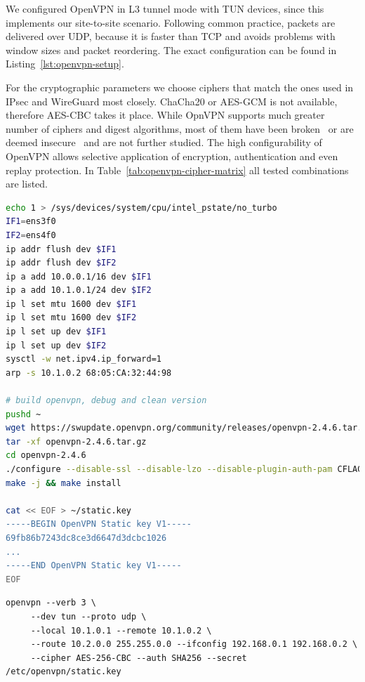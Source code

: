 \documentclass[IN,11pt,twoside,openright,master,english]{tumthesis}
\begin{document}
We configured OpenVPN in L3 tunnel mode with TUN devices, since this implements our site-to-site scenario. Following common practice, packets are delivered over UDP, because it is faster than TCP and avoids problems with window sizes and packet reordering. The exact configuration can be found in Listing~\ref{lst:openvpn-setup}.


For the cryptographic parameters we choose ciphers that match the ones used in IPsec and WireGuard most closely. ChaCha20 or AES-GCM is not available, therefore AES-CBC takes it place. While OpnVPN supports much greater number of ciphers and digest algorithms, most of them have been broken~\cite{} or are deemed insecure~\cite{} and are not further studied. The high configurability of OpenVPN allows selective application of encryption, authentication and even replay protection.
In Table~\ref{tab:openvpn-cipher-matrix} all tested combinations are listed.

\begin{lstlisting}[caption={DuT peraration steps for OpenVPN},captionpos=b,label={lst:openvpn-prep},language=bash]
echo 1 > /sys/devices/system/cpu/intel_pstate/no_turbo
IF1=ens3f0
IF2=ens4f0
ip addr flush dev $IF1
ip addr flush dev $IF2
ip a add 10.0.0.1/16 dev $IF1
ip a add 10.1.0.1/24 dev $IF2
ip l set mtu 1600 dev $IF1
ip l set mtu 1600 dev $IF2
ip l set up dev $IF1
ip l set up dev $IF2
sysctl -w net.ipv4.ip_forward=1
arp -s 10.1.0.2 68:05:CA:32:44:98

# build openvpn, debug and clean version
pushd ~
wget https://swupdate.openvpn.org/community/releases/openvpn-2.4.6.tar.gz
tar -xf openvpn-2.4.6.tar.gz
cd openvpn-2.4.6
./configure --disable-ssl --disable-lzo --disable-plugin-auth-pam CFLAGS='-g -O2 -fno-omit-frame-pointer'
make -j && make install

cat << EOF > ~/static.key
-----BEGIN OpenVPN Static key V1-----
69fb86b7243dc8ce3d6647d3dcbc1026
...
-----END OpenVPN Static key V1-----
EOF
\end{lstlisting}


\begin{lstlisting}[caption={OpenVPN command for setup 1 on the DuT},captionpos=b,label={lst:openvpn-setup}]
openvpn --verb 3 \
	 --dev tun --proto udp \
	 --local 10.1.0.1 --remote 10.1.0.2 \
	 --route 10.2.0.0 255.255.0.0 --ifconfig 192.168.0.1 192.168.0.2 \
	 --cipher AES-256-CBC --auth SHA256 --secret /etc/openvpn/static.key
\end{lstlisting}
\end{document}
